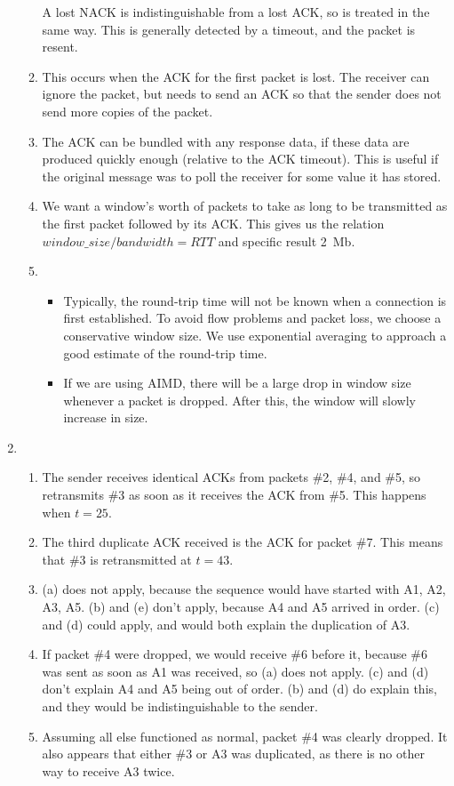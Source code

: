 \documentclass{article}
\begin{document}
\begin{enumerate}
\begin{enumerate}
        A lost NACK is indistinguishable from a lost ACK, so is treated in the same way. This is generally detected by a timeout, and the packet is resent.
      \item This occurs when the ACK for the first packet is lost. The receiver can ignore the packet, but needs to send an ACK so that the sender does not send more copies of the packet.
      \item The ACK can be bundled with any response data, if these data are produced quickly enough (relative to the ACK timeout). This is useful if the original message was to poll the receiver for some value it has stored.
      \item We want a window's worth of packets to take as long to be transmitted as the first packet followed by its ACK. This gives us the relation $\mathit{window\_size} / \mathit{bandwidth} = \mathit{RTT}$ and specific result \SI{2}{Mb}.
      \item
        \begin{itemize}
          \item Typically, the round-trip time will not be known when a connection is first established. To avoid flow problems and packet loss, we choose a conservative window size. We use exponential averaging to approach a good estimate of the round-trip time.
          \item If we are using AIMD, there will be a large drop in window size whenever a packet is dropped. After this, the window will slowly increase in size.
        \end{itemize}
    \end{enumerate}
  \item
    \begin{enumerate}
      \item The sender receives identical ACKs from packets \#2, \#4, and \#5, so retransmits \#3 as soon as it receives the ACK from \#5. This happens when $t = 25$.
      \item The third duplicate ACK received is the ACK for packet \#7. This means that \#3 is retransmitted at $t = 43$.
      \item (a) does not apply, because the sequence would have started with A1, A2, A3, A5. (b) and (e) don't apply, because A4 and A5 arrived in order. (c) and (d) could apply, and would both explain the duplication of A3.
      \item If packet \#4 were dropped, we would receive \#6 before it, because \#6 was sent as soon as A1 was received, so (a) does not apply. (c) and (d) don't explain A4 and A5 being out of order. (b) and (d) do explain this, and they would be indistinguishable to the sender.
      \item Assuming all else functioned as normal, packet \#4 was clearly dropped. It also appears that either \#3 or A3 was duplicated, as there is no other way to receive A3 twice.
    \end{enumerate}
\end{enumerate}
\end{document}

